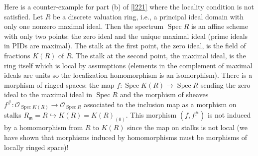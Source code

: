 \documentclass[12pt]{article}
\theoremstyle{remark}
\newcommand{\Spec}[0]{\operatorname{Spec}}
\begin{document}
	Here is a counter-example for part (b) of \autoref{l221} where the locality condition is not satisfied. Let $R$ be a discrete valuation ring, i.e., a principal ideal domain with only one nonzero maximal ideal. Then the spectrum $\Spec R$ is an affine scheme with only two points: the zero ideal and the unique maximal ideal (prime ideals in PIDs are maximal). The stalk at the first point, the zero ideal, is the field of fractions $K(R)$ of $R$. The stalk at the second point, the maximal ideal, is the ring itself which is local by assumptions (elements in the complement of maximal ideals are units so the localization homomorphism is an isomorphism). There is a morphism of ringed spaces: the map $f:\Spec K(R)\to \Spec R$ sending the zero ideal to the maximal ideal in $\Spec R$ and the morphism of sheaves $f^\#: \mathscr O_{\Spec K(R)}\to\mathscr O_{\Spec R}$ associated to the inclusion map as a morphism on stalks $R_{\mathfrak m}=R\hookrightarrow K(R)=K(R)_{(0)}$. This morphism $(f, f^\#)$ is not induced by a homomorphism from $R$ to $K(R)$ since the map on stalks is not local (we have shown that morphisms induced by homomorphisms must be morphisms of locally ringed space)!
\end{document}
